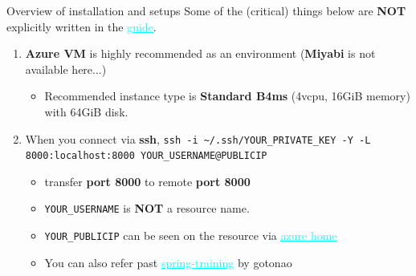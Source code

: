 \documentclass[dvipdfmx, 11pt, aspectratio=169]{beamer}   %
\newcommand{\ulhref}[2]{\href{#1}{\textcolor{cyan}{\uline{#2}}}}
\begin{document}
\begin{frame}[fragile]{Overview of installation and setups}
Some of the (critical) things below are \textbf{NOT} explicitly written in the \ulhref{https://sdk.cerebras.net/installation-guide}{guide}.
\begin{enumerate}
    \item \textbf{Azure VM} is highly recommended as an environment (\textbf{Miyabi} is not available here...)
    \begin{itemize}
        \item Recommended instance type is \textbf{Standard B4ms} (4vcpu, 16GiB memory) with 64GiB disk.
    \end{itemize}
    \item When you connect via \textbf{ssh}, \lstinline|ssh -i ~/.ssh/YOUR_PRIVATE_KEY -Y -L 8000:localhost:8000 YOUR_USERNAME@PUBLICIP|
    \begin{itemize}
        \item transfer \textbf{port 8000} to remote \textbf{port 8000}
        \item \lstinline|YOUR_USERNAME| is \textbf{NOT} a resource name.
        \item \lstinline|YOUR_PUBLICIP| can be seen on the resource via \ulhref{https://portal.azure.com/?feature.msaljs=true\#home}{azure home}
        \item You can also refer past \ulhref{https://gitlab.eidos.ic.i.u-tokyo.ac.jp/eidos/labdocs/-/tree/master/spring-training/2025/05-environment-setup-azure?ref_type=heads}{spring-training} by gotonao
    \end{itemize}
\end{enumerate}
\end{frame}
\end{document}
